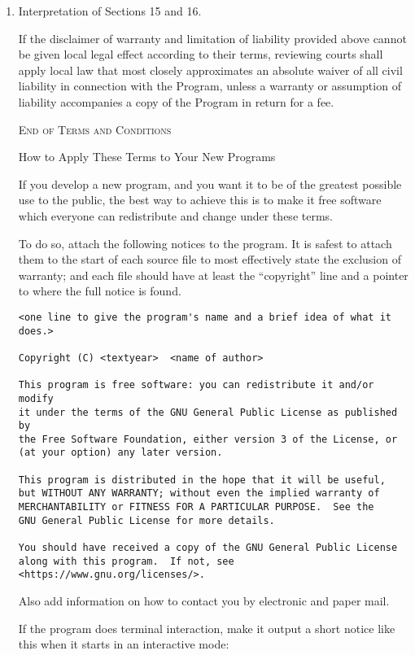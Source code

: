 \documentclass{scrbook}
\begin{document}
\begin{enumerate}
\item Interpretation of Sections 15 and 16.

If the disclaimer of warranty and limitation of liability provided
above cannot be given local legal effect according to their terms,
reviewing courts shall apply local law that most closely approximates
an absolute waiver of all civil liability in connection with the
Program, unless a warranty or assumption of liability accompanies a
copy of the Program in return for a fee.

\begin{center}
{\Large\textsc{End of Terms and Conditions}}

\bigskip
How to Apply These Terms to Your New Programs
\end{center}

If you develop a new program, and you want it to be of the greatest
possible use to the public, the best way to achieve this is to make it
free software which everyone can redistribute and change under these terms.

To do so, attach the following notices to the program.  It is safest
to attach them to the start of each source file to most effectively
state the exclusion of warranty; and each file should have at least
the ``copyright'' line and a pointer to where the full notice is found.

{\footnotesize
\begin{verbatim}
<one line to give the program's name and a brief idea of what it does.>

Copyright (C) <textyear>  <name of author>

This program is free software: you can redistribute it and/or modify
it under the terms of the GNU General Public License as published by
the Free Software Foundation, either version 3 of the License, or
(at your option) any later version.

This program is distributed in the hope that it will be useful,
but WITHOUT ANY WARRANTY; without even the implied warranty of
MERCHANTABILITY or FITNESS FOR A PARTICULAR PURPOSE.  See the
GNU General Public License for more details.

You should have received a copy of the GNU General Public License
along with this program.  If not, see <https://www.gnu.org/licenses/>.
\end{verbatim}
}

Also add information on how to contact you by electronic and paper mail.

If the program does terminal interaction, make it output a short
notice like this when it starts in an interactive mode:


\end{enumerate}
\end{document}
